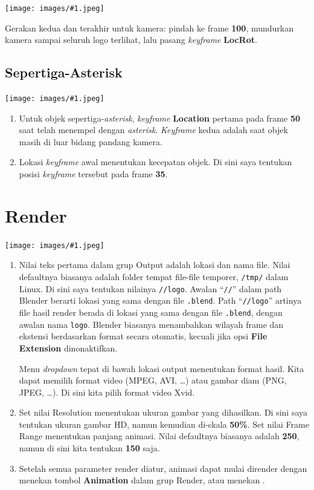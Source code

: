 \documentclass[11pt]{report}
\newcommand{\figL}[1]{
  \begingroup
  \centering
  \texttt{[image: images/\#1.jpeg]}
  \label{fig:#1}
  \endgroup
}
\def\key#1{\fbox{\bfseries\ttfamily#1}}
\begin{document}
\figL{logo-003}

Gerakan kedua dan terakhir untuk kamera: pindah ke frame \textbf{100}, mundurkan kamera sampai seluruh logo terlihat, lalu pasang \textsl{keyframe} \textbf{LocRot}.


\subsection{Sepertiga-Asterisk}

\figL{logo-004}

\begin{enumerate}
\item Untuk objek sepertiga-\textsl{asterisk}, \textsl{keyframe} \textbf{Location} pertama pada frame \textbf{50} saat telah menempel dengan \textsl{asterisk}. \textsl{Keyframe} kedua adalah saat objek masih di luar bidang pandang kamera.

\item Lokasi \textsl{keyframe} awal menentukan kecepatan objek. Di sini saya tentukan posisi \textsl{keyframe} tersebut pada frame \textbf{35}.
\end{enumerate}

\section{Render}

\figL{logo-005}

\begin{enumerate}
\item Nilai teks pertama dalam grup \textsf{Output} adalah lokasi dan nama file. Nilai defaultnya biasanya adalah folder tempat file-file temporer, \texttt{/tmp/} dalam Linux. Di sini saya tentukan nilainya \texttt{//logo}. Awalan ``\texttt{//}'' dalam path Blender berarti lokasi yang sama dengan file \texttt{.blend}. Path ``\texttt{//logo}'' artinya file hasil render berada di lokasi yang sama dengan file \texttt{.blend}, dengan awalan nama \texttt{logo}. Blender biasanya menambahkan wilayah frame dan ekstensi berdasarkan format secara otomatis, kecuali jika opsi \textbf{File Extension} dinonaktifkan.

  Menu \textsl{dropdown} tepat di bawah lokasi output menentukan format hasil. Kita dapat memilih format video (MPEG, AVI, \ldots) atau gambar diam (PNG, JPEG, \ldots). Di sini kita pilih format video Xvid.

\item Set nilai \textsf{Resolution} menentukan ukuran gambar yang dihasilkan. Di sini saya tentukan ukuran gambar HD, namun kemudian di-skala \textbf{50\%}. Set nilai \textsf{Frame Range} menentukan panjang animasi. Nilai defaultnya biasanya adalah \textbf{250}, namun di sini kita tentukan \textbf{150} saja.

\item Setelah semua parameter render diatur, animasi dapat mulai dirender dengan menekan tombol \textbf{Animation} dalam grup \textsf{Render}, atau menekan \key{Ctrl-F12}.
\end{enumerate}
\end{document}
